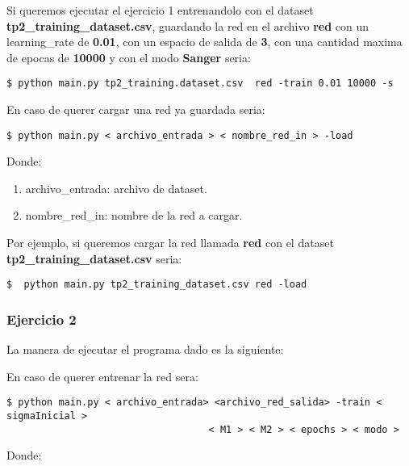 Si queremos ejecutar el ejercicio 1 entrenandolo con el dataset \textbf{tp2\_training\_dataset.csv}, guardando la red en el archivo 
\textbf{red} con un learning\_rate de \textbf{0.01}, con un espacio de salida de \textbf{3}, con una cantidad maxima de epocas de \textbf{10000} y con el modo \textbf{Sanger} seria:

\begin{verbatim}
$ python main.py tp2_training.dataset.csv  red -train 0.01 10000 -s
\end{verbatim}

En caso de querer cargar una red ya guardada seria:

\begin{verbatim}
$ python main.py < archivo_entrada > < nombre_red_in > -load
\end{verbatim}

Donde:

\begin{enumerate}
\item archivo\_entrada: archivo de dataset.
\item nombre\_red\_in: nombre de la red a cargar.
\end{enumerate}

Por ejemplo, si queremos cargar la red llamada \textbf{red} con el dataset \textbf{tp2\_training\_dataset.csv} seria:

\begin{verbatim}
$  python main.py tp2_training_dataset.csv red -load
\end{verbatim}

\subsubsection{Ejercicio 2}

La manera de ejecutar el programa dado es la siguiente:

En caso de querer entrenar la red sera:

\begin{verbatim}
$ python main.py < archivo_entrada> <archivo_red_salida> -train < sigmaInicial > 
                                   < M1 > < M2 > < epochs > < modo >
\end{verbatim}

Donde:

